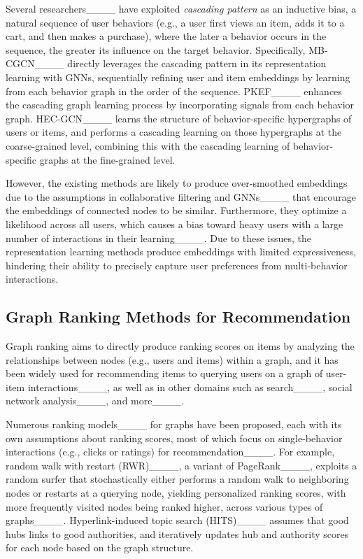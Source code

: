 Several researchers____ have exploited \textit{cascading pattern} as an inductive bias, a natural sequence of user behaviors (e.g., a user first views an item, adds it to a cart, and then makes a purchase), where the later a behavior occurs in the sequence, the greater its influence on the target behavior.
Specifically, MB-CGCN____ directly leverages the cascading pattern in its representation learning with GNNs, sequentially refining user and item embeddings by learning from each behavior graph in the order of the sequence.
PKEF____ enhances the cascading graph learning process by incorporating signals from each behavior graph.
HEC-GCN____ learns the structure of behavior-specific hypergraphs of users or items, and performs a cascading learning on those hypergraphs at the coarse-grained level, combining this with the cascading learning of behavior-specific graphs at the fine-grained level.

However, the existing methods are likely to produce over-smoothed embeddings due to the assumptions in collaborative filtering and GNNs____ that encourage the embeddings of connected nodes to be similar.
Furthermore, they optimize a likelihood across all users, which causes a bias toward heavy users with a large number of interactions in their learning____.
Due to these issues, the representation learning methods produce embeddings with limited expressiveness, hindering their ability to precisely capture user preferences from multi-behavior interactions.

\subsection{Graph Ranking Methods for Recommendation}
\label{sec:related:graph}
Graph ranking aims to directly produce ranking scores on items by analyzing the relationships between nodes (e.g., users and items) within a graph, and it has been widely used for recommending items to querying users on a graph of user-item interactions____, as well as in other domains such as search____, social network analysis____, and more____.

Numerous ranking models____ for graphs have been proposed, each with its own assumptions about ranking scores, most of which focus on single-behavior interactions (e.g., clicks or ratings) for recommendation____.
%
For example, random walk with restart (RWR)____, a variant of PageRank____, exploits a random surfer that stochastically either performs a random walk to neighboring nodes or restarts at a querying node, yielding personalized ranking scores, with more frequently visited nodes being ranked higher, across various types of graphs____.
Hyperlink-induced topic search (HITS)____ assumes that good hubs links to good authorities, and iteratively updates hub and authority scores for each node based on the graph structure. 

